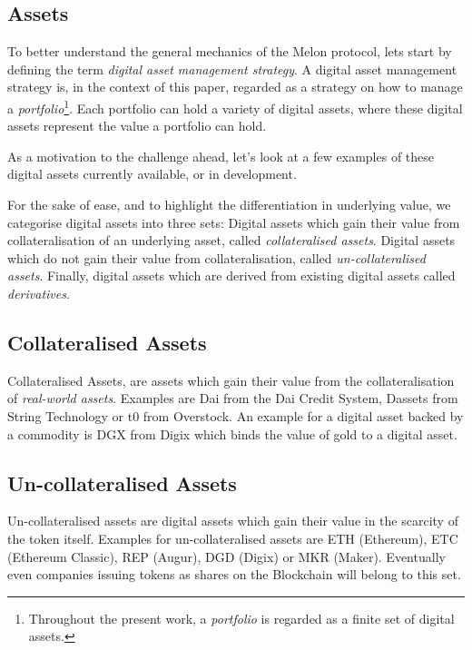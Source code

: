 \documentclass[9pt,oneside]{amsart}
\theoremstyle{plain}
\begin{document}
\begin{multicols}{2}
\section{Assets}\label{sec:assets}

To better understand the general mechanics of the Melon protocol, lets start by defining the term \textit{digital asset management strategy}. A digital asset management strategy is, in the context of this paper, regarded as a strategy on how to manage a \textit{portfolio}\footnote{Throughout the present work, a \textit{portfolio} is regarded as a finite set of digital assets.}.
Each portfolio can hold a variety of digital assets, where these digital assets represent the value a portfolio can hold.

As a motivation to the challenge ahead, let's look at a few examples of these digital assets currently available, or in development.

For the sake of ease, and to highlight the differentiation in underlying value, we categorise digital assets into three sets: Digital assets which gain their value from collateralisation of an underlying asset, called \textit{collateralised assets}. Digital assets which do not gain their value from collateralisation, called \textit{un-collateralised assets}. Finally, digital assets which are derived from existing digital assets called \textit{derivatives}.

\subsection{Collateralised Assets}\label{sub:altcoins}

Collateralised Assets, are assets which gain their value from the collateralisation of \textit{real-world assets}.
Examples are Dai from the Dai Credit System\cite{makerdao}, Dassets\cite{string:technology} from String Technology or t0\cite{t0} from Overstock. An example for a digital asset backed by a commodity is DGX from Digix\cite{digix} which binds the value of gold to a digital asset.


\subsection{Un-collateralised Assets}\label{sub:coins}

Un-collateralised assets are digital assets which gain their value in the scarcity of the token itself.
Examples for un-collateralised assets are ETH (Ethereum\cite{ethereum}), ETC (Ethereum Classic\cite{ethereumclassic}), REP (Augur\cite{augur}), DGD (Digix\cite{digix}) or MKR (Maker\cite{makerdao}). Eventually even companies issuing tokens as shares on the Blockchain will belong to this set.


\end{multicols}
\end{document}
